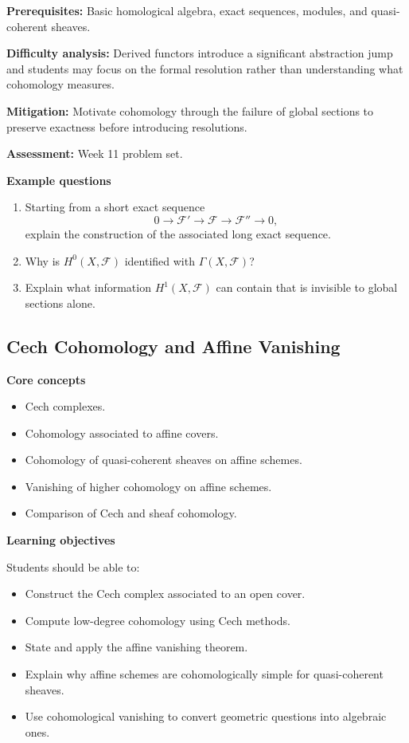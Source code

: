 \documentclass[11pt]{article}
\begin{document}
\textbf{Prerequisites:} Basic homological algebra, exact sequences, modules, and quasi-coherent sheaves.

\textbf{Difficulty analysis:} Derived functors introduce a significant abstraction jump and students may focus on the formal resolution rather than understanding what cohomology measures.

\textbf{Mitigation:} Motivate cohomology through the failure of global sections to preserve exactness before introducing resolutions.

\textbf{Assessment:} Week 11 problem set.

\textbf{Example questions}
\begin{enumerate}
    \item Starting from a short exact sequence
    \[
    0\to\mathcal{F}'\to\mathcal{F}\to\mathcal{F}''\to0,
    \]
    explain the construction of the associated long exact sequence.
    \item Why is $H^0(X,\mathcal{F})$ identified with $\Gamma(X,\mathcal{F})$?
    \item Explain what information $H^1(X,\mathcal{F})$ can contain that is invisible to global sections alone.
\end{enumerate}

\subsection{Cech Cohomology and Affine Vanishing}

\textbf{Core concepts}
\begin{itemize}
    \item Cech complexes.
    \item Cohomology associated to affine covers.
    \item Cohomology of quasi-coherent sheaves on affine schemes.
    \item Vanishing of higher cohomology on affine schemes.
    \item Comparison of Cech and sheaf cohomology.
\end{itemize}

\textbf{Learning objectives}

Students should be able to:
\begin{itemize}
    \item Construct the Cech complex associated to an open cover.
    \item Compute low-degree cohomology using Cech methods.
    \item State and apply the affine vanishing theorem.
    \item Explain why affine schemes are cohomologically simple for quasi-coherent sheaves.
    \item Use cohomological vanishing to convert geometric questions into algebraic ones.
\end{itemize}
\end{document}
